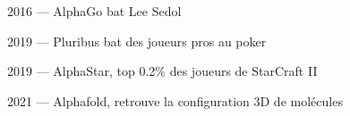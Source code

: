\begin{frame}{2016 --- AlphaGo bat Lee Sedol}
\end{frame}

\begin{frame}{2019 --- Pluribus bat des joueurs pros au poker}
\end{frame}

\begin{frame}{2019 --- AlphaStar, top 0.2\% des joueurs de StarCraft II}
\end{frame}

\begin{frame}{2021 --- Alphafold, retrouve la configuration 3D de molécules}
\end{frame}
